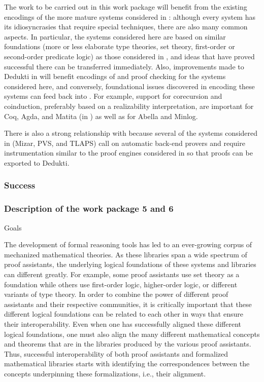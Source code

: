 The work to be carried out in this work package will benefit from the existing
encodings of the more mature systems considered in :
although every system has its idiosyncrasies that require special techniques,
there are also many common aspects. In particular, the systems considered here
are based on similar foundations (more or less elaborate type theories, set
theory, first-order or second-order predicate logic) as those considered in
, and ideas that have proved successful there can be
transferred immediately. Also, improvements made to Dedukti in
 will benefit encodings of and proof checking for the
systems considered here, and conversely, foundational issues discovered in
encoding these systems can feed back into . For example,
support for corecursion and coinduction, preferably based on a realizability
interpretation, are important for Coq, Agda, and Matita (in
) as well as for Abella and Minlog.

There is also a strong relationship with  because several of the
systems considered in  (Mizar, PVS, and TLAPS) call on automatic
back-end provers and require instrumentation similar to the proof engines
considered in  so that proofs can be exported to Dedukti.

\subsubsection*{Success}



\subsubsection{Description of the work package 5 and 6}

{\color{red} Goals}

The development of formal reasoning tools has led to an ever-growing
corpus of mechanized mathematical theories. As these libraries span a
wide spectrum of proof assistants, the underlying logical foundations
of these systems and libraries can different greatly. For example,
some proof assistants use set theory as a foundation while others use
first-order logic, higher-order logic, or different variants of type
theory.  In order to combine the power of different proof assistants
and their respective communities, it is critically important that
these different logical foundations can be related to each other in
ways that ensure their interoperability.  Even when one has
successfully aligned these different logical foundations, one must
also align the many different mathematical concepts and theorems that
are in the libraries produced by the various proof assistants. Thus,
successful interoperability of both proof assistants and formalized
mathematical libraries starts with identifying the correspondences
between the concepts underpinning these formalizations, i.e., their
alignment.

